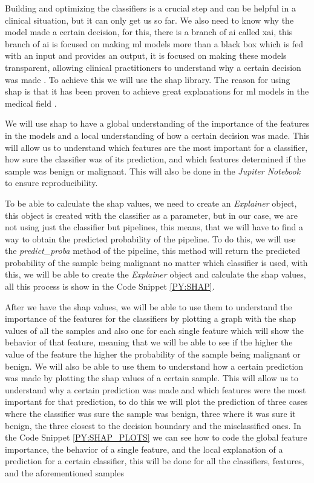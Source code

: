 Building and optimizing the classifiers is a crucial step and can be helpful in a clinical situation, but it can only get us so far. We also need to know why the model made a certain decision, for this, there is a branch of \ac{ai} called \acl{xai}, this branch of \ac{ai} is focused on making \ac{ml} models more than a black box which is fed with an input and provides an output, it is focused on making these models transparent, allowing clinical practitioners to understand why a certain decision was made \cite{borys_explainable_2023}. To achieve this we will use the \acl{shap} library. The reason for using \ac{shap} is that it has been proven to achieve great explanations for \ac{ml} models in the medical field \cite{massafra_analyzing_2023}.

We will use \ac{shap} to have a global understanding of the importance of the features in the models and a local understanding of how a certain decision was made. This will allow us to understand which features are the most important for a classifier, how sure the classifier was of its prediction, and which features determined if the sample was benign or malignant. This will also be done in the \textit{Jupiter Notebook} to ensure reproducibility.

To be able to calculate the \ac{shap} values, we need to create an \textit{Explainer} object, this object is created with the classifier as a parameter, but in our case, we are not using just the classifier but pipelines, this means, that we will have to find a way to obtain the predicted probability of the pipeline. To do this, we will use the \textit{predict\_proba} method of the pipeline, this method will return the predicted probability of the sample being malignant no matter which classifier is used, with this, we will be able to create the \textit{Explainer} object and calculate the \ac{shap} values, all this process is show in the Code Snippet \ref{PY:SHAP}.

After we have the \ac{shap} values, we will be able to use them to understand the importance of the features for the classifiers by plotting a graph with the \ac{shap} values of all the samples and also one for each single feature which will show the behavior of that feature, meaning that we will be able to see if the higher the value of the feature the higher the probability of the sample being malignant or benign. We will also be able to use them to understand how a certain prediction was made by plotting the \ac{shap} values of a certain sample. This will allow us to understand why a certain prediction was made and which features were the most important for that prediction, to do this we will plot the prediction of three cases where the classifier was sure the sample was benign, three where it was sure it benign, the three closest to the decision boundary and the misclassified ones. In the Code Snippet \ref{PY:SHAP_PLOTS} we can see how to code the global feature importance, the behavior of a single feature, and the local explanation of a prediction for a certain classifier, this will be done for all the classifiers, features, and the aforementioned samples

